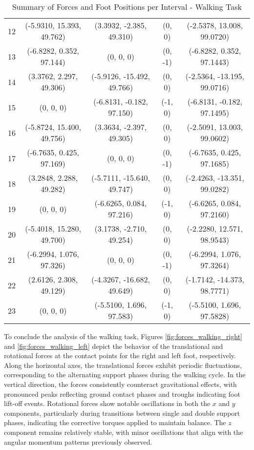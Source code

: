 \documentclass[main.tex]{subfiles}
\begin{document}
\begin{sloppypar}
\begin{table}[H]
{\begin{tabular}{c|c|c|c|c}
            12 & (-5.9310, 15.393, 49.762) & (3.3932, -2.385, 49.310) & (0, 0) & (-2.5378, 13.008, 99.0720) \\
            13 & (-6.8282, 0.352, 97.144) & (0, 0, 0) & (0, -1) & (-6.8282, 0.352, 97.1443) \\
            14 & (3.3762, 2.297, 49.306) & (-5.9126, -15.492, 49.766) & (0, 0) & (-2.5364, -13.195, 99.0716) \\
            15 & (0, 0, 0) & (-6.8131, -0.182, 97.150) & (-1, 0) & (-6.8131, -0.182, 97.1495) \\
            16 & (-5.8724, 15.400, 49.756) & (3.3634, -2.397, 49.305) & (0, 0) & (-2.5091, 13.003, 99.0602) \\
            17 & (-6.7635, 0.425, 97.169) & (0, 0, 0) & (0, -1) & (-6.7635, 0.425, 97.1685) \\
            18 & (3.2848, 2.288, 49.282) & (-5.7111, -15.640, 49.747) & (0, 0) & (-2.4263, -13.351, 99.0282) \\
            19 & (0, 0, 0) & (-6.6265, 0.084, 97.216) & (-1, 0) & (-6.6265, 0.084, 97.2160) \\
            20 & (-5.4018, 15.280, 49.700) & (3.1738, -2.710, 49.254) & (0, 0) & (-2.2280, 12.571, 98.9543) \\
            21 & (-6.2994, 1.076, 97.326) & (0, 0, 0) & (0, -1) & (-6.2994, 1.076, 97.3264) \\
            22 & (2.6126, 2.308, 49.129) & (-4.3267, -16.682, 49.649) & (0, 0) & (-1.7142, -14.373, 98.7771) \\
            23 & (0, 0, 0) & (-5.5100, 1.696, 97.583) & (-1, 0) & (-5.5100, 1.696, 97.5828) \\
            \hline
        \end{tabular}
    }
    \caption{Summary of Forces and Foot Positions per Interval - Walking Task}
    \label{tab:data_table}
\end{table}
To conclude the analysis of the walking task, Figures \ref{fig:forces_walking_right} and \ref{fig:forces_walking_left} depict the behavior of the translational and rotational forces at the contact points for the right and left foot, respectively. Along the horizontal axes, the translational forces exhibit periodic fluctuations, corresponding to the alternating support phases during the walking cycle. In the vertical direction, the forces consistently counteract gravitational effects, with pronounced peaks reflecting ground contact phases and troughs indicating foot lift-off events.
Rotational forces show notable oscillations in both the $x$ and $y$ components, particularly during transitions between single and double support phases, indicating the corrective torques applied to maintain balance. The $z$ component remains relatively stable, with minor oscillations that align with the angular momentum patterns previously observed.

\end{sloppypar}
\end{document}
